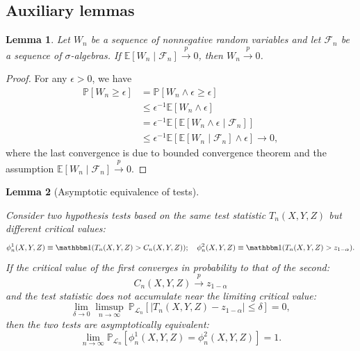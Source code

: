 \documentclass[aos]{imsart}
\theoremstyle{plain}
\newtheorem{lemma}{Lemma}
\theoremstyle{remark}
\newcommand{\E}{\mathbb E}								%
\renewcommand{\P}{\mathbb{P}}							%
\newcommand{\indicator}{\mathbbm 1}						%
\newcommand{\convp}{\overset p \rightarrow}             %
\newcommand{\srx}{X}									%
\newcommand{\srz}{Z}									%
\newcommand{\sry}{Y}									%
\newcommand{\law}{\mathcal L}							%
\begin{document}
\subsection{Auxiliary lemmas}

\begin{lemma}
	\label{lem:conditional-expectation-to-unconditional}
	Let $W_n$ be a sequence of nonnegative random variables and let $\mathcal F_n$ be a sequence of $\sigma$-algebras. If $\E[W_n \mid \mathcal{F}_n]\convp 0$, then $ W_n \convp 0$.
\end{lemma}
\begin{proof}
	For any $\epsilon>0$, we have
	\begin{align}
		\P[W_n \geq \epsilon] &= \P[W_n \wedge \epsilon \geq \epsilon] \\
		&\leq \epsilon^{-1} \E[W_n \wedge \epsilon] \\
		&= \epsilon^{-1} \E[\E[W_n \wedge \epsilon\mid \mathcal{F}_n]]\\
		&\leq \epsilon^{-1} \E[\E[W_n \mid \mathcal{F}_n]\wedge \epsilon] \to 0,
	\end{align}
	where the last convergence is due to bounded convergence theorem and the assumption $\E[W_n \mid \mathcal{F}_n]\convp 0$. 
\end{proof}


\begin{lemma}[Asymptotic equivalence of tests] \label{lem:equivalence-lemma}
	
Consider two hypothesis tests based on the same test statistic $T_n(\srx, \sry, \srz)$ but different critical values:
\begin{equation*}
\phi_n^1(\srx, \sry, \srz) \equiv \indicator(T_n(\srx, \sry, \srz) > C_n(\srx, \sry, \srz)); \quad \phi_n^2(\srx, \sry, \srz) \equiv \indicator(T_n(\srx, \sry, \srz) > z_{1-\alpha}). 
\end{equation*}
If the critical value of the first converges in probability to that of the second:
\begin{equation}
C_n(\srx, \sry, \srz) \convp z_{1-\alpha}
\label{eq:convergence-of-critical-value}
\end{equation}
and the test statistic does not accumulate near the limiting critical value:
\begin{equation}
\lim_{\delta \rightarrow 0}\limsup_{n \rightarrow \infty}\ \P_{\law_n}[|T_n(\srx, \sry, \srz)-z_{1-\alpha}| \leq \delta] = 0,
\label{eq:non-accumulation-app}
\end{equation}
then the two tests are asymptotically equivalent:
\begin{equation}
\lim_{n \rightarrow \infty}\P_{\law_n}[\phi_n^{1}(\srx, \sry, \srz) = \phi_n^2(\srx, \sry, \srz)] = 1.
\end{equation}
\end{lemma}
\end{document}
